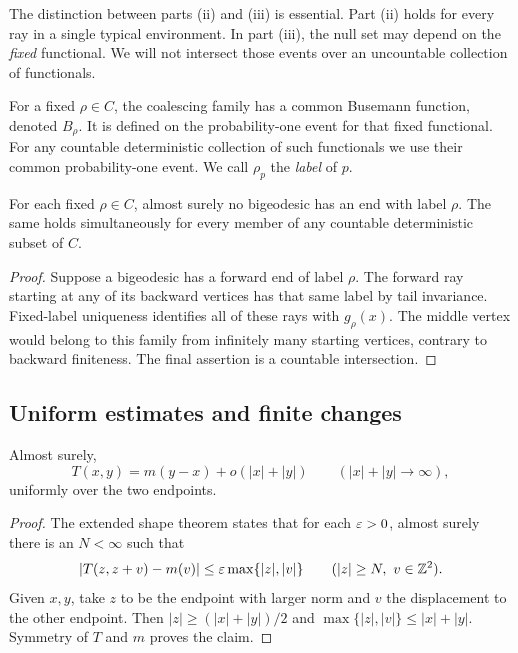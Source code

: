 The distinction between parts \textup{(ii)} and \textup{(iii)} is
essential. Part \textup{(ii)} holds for every ray in a single typical
environment. In part \textup{(iii)}, the null set may depend on the
\emph{fixed} functional. We will not intersect those events over an
uncountable collection of functionals.

For a fixed \(\rho\in C\), the coalescing family has a common Busemann
function, denoted \(B_\rho\). It is defined on the probability-one
event for that fixed functional. For any countable deterministic
collection of such functionals we use their common probability-one
event.
We call \(\rho_p\) the \emph{label} of \(p\).

\begin{corollary}
\label{cor:fixed-label}
For each fixed \(\rho\in C\), almost surely no bigeodesic has an end
with label \(\rho\). The same holds simultaneously for every member
of any countable deterministic subset of \(C\).
\end{corollary}
\begin{proof}
Suppose a bigeodesic has a forward end of label \(\rho\).
The forward ray starting at any of its backward vertices has that
same label by tail invariance. Fixed-label uniqueness identifies all
of these rays with \(g_\rho(x)\).
The middle vertex would belong to this family from infinitely many
starting vertices, contrary to backward finiteness.
The final assertion is a countable intersection.
\end{proof}

\subsection{Uniform estimates and finite changes}
\begin{lemma}\label{lem:uniform-metric}
Almost surely,
\begin{equation}\label{eq:uniform-metric}
 T(x,y)=m(y-x)+o(|x|+|y|)
 \qquad (|x|+|y|\to\infty),
\end{equation}
uniformly over the two endpoints.
\end{lemma}
\begin{proof}
The extended shape theorem
\cite[Proposition 3.4]{AhlbergHoffman} states that for each
\(\varepsilon>0\), almost surely there is an \(N<\infty\) such that
\[
 |T(z,z+v)-m(v)|\le\varepsilon\max\{|z|,|v|\}
 \qquad (|z|\ge N,\ v\in\mathbb Z^2).
\]
Given \(x,y\), take \(z\) to be the endpoint with larger norm and \(v\)
the displacement to the other endpoint.
Then \(|z|\ge (|x|+|y|)/2\) and
\(\max\{|z|,|v|\}\le |x|+|y|\).
Symmetry of \(T\) and \(m\) proves the claim.
\end{proof}

